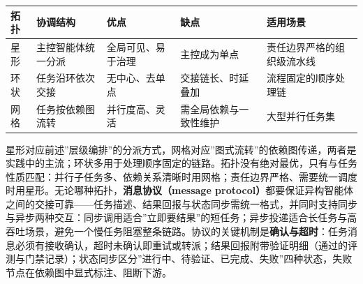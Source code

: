 \documentclass[
]{ctexbook}
\newcounter{none}
\begin{document}
{\def\LTcaptype{none} %
\begin{longtable}[]{@{}
  >{\raggedright\arraybackslash}p{}
  >{\raggedright\arraybackslash}p{}
  >{\raggedright\arraybackslash}p{}
  >{\raggedright\arraybackslash}p{}
  >{\raggedright\arraybackslash}p{}@{}}
\toprule\noalign{}
\begin{minipage}[b]{\linewidth}\raggedright
拓扑
\end{minipage} & \begin{minipage}[b]{\linewidth}\raggedright
协调结构
\end{minipage} & \begin{minipage}[b]{\linewidth}\raggedright
优点
\end{minipage} & \begin{minipage}[b]{\linewidth}\raggedright
缺点
\end{minipage} & \begin{minipage}[b]{\linewidth}\raggedright
适用场景
\end{minipage} \\
\midrule\noalign{}
\endhead
\bottomrule\noalign{}
\endlastfoot
星形 & 主控智能体统一分派 & 全局可见、易于治理 & 主控成为单点 &
责任边界严格的组织级流水线 \\
环状 & 任务沿环依次交接 & 无中心、去单点 & 交接链长、时延叠加 &
流程固定的顺序处理链 \\
网格 & 任务按依赖图流转 & 并行度高、灵活 & 需全局依赖与一致性维护 &
大型并行任务集 \\
\end{longtable}
}

星形对应前述''层级编排''的分派方式，网格对应''图式流转''的依赖图传递，两者是实践中的主流；环状多用于处理顺序固定的链路。拓扑没有绝对最优，只有与任务性质匹配：并行子任务多、依赖关系清晰时用网格；责任边界严格、需要统一调度时用星形。无论哪种拓扑，\textbf{消息协议（message
protocol）}都要保证异构智能体之间的交接可靠------任务描述、结果回报与状态同步需统一格式，并同时支持同步与异步两种交互：同步调用适合''立即要结果''的短任务；异步投递适合长任务与高吞吐场景，避免一个慢任务阻塞整条链路。协议的关键机制是\textbf{确认与超时}：任务消息必须有接收确认，超时未确认即重试或转派；结果回报附带验证明细（通过的评测与门禁记录）；状态同步区分''进行中、待验证、已完成、失败''四种状态，失败节点在依赖图中显式标注、阻断下游。
\end{document}
